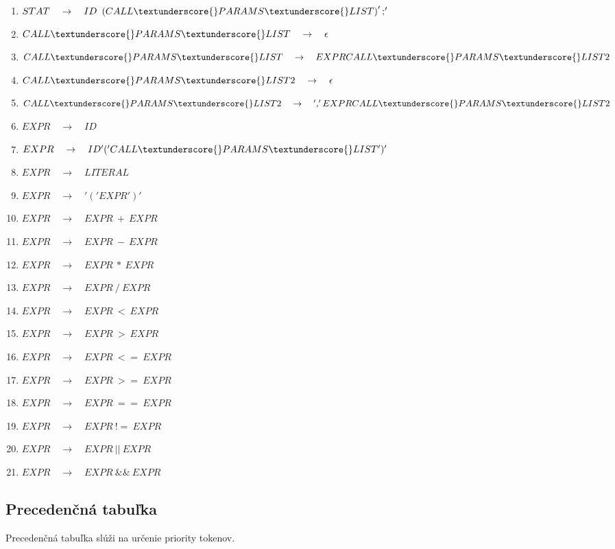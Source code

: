 \documentclass[12pt, a4paper]{article}
\begin{document}
\begin{enumerate}
				\item \( STAT\quad{}\rightarrow\quad{}ID\ \left( CALL\textunderscore{}PARAMS\textunderscore{}LIST \right) ';' \)
				\item \( CALL\textunderscore{}PARAMS\textunderscore{}LIST\quad{}\rightarrow\quad{}\epsilon \)
				\item \( CALL\textunderscore{}PARAMS\textunderscore{}LIST\quad{}\rightarrow\quad{}EXPR CALL\textunderscore{}PARAMS\textunderscore{}LIST2 \)
				\item \( CALL\textunderscore{}PARAMS\textunderscore{}LIST2\quad{}\rightarrow\quad{}\epsilon \)
				\item \( CALL\textunderscore{}PARAMS\textunderscore{}LIST2\quad{}\rightarrow\quad{}',' EXPR CALL\textunderscore{}PARAMS\textunderscore{}LIST2 \)
				\item \( EXPR\quad{}\rightarrow\quad{}ID \)
				\item \( EXPR\quad{}\rightarrow\quad{}ID '(' CALL\textunderscore{}PARAMS\textunderscore{}LIST ')' \)
				\item \( EXPR\quad{}\rightarrow\quad{}LITERAL \)
				\item \( EXPR\quad{}\rightarrow\quad{}'(' EXPR ')' \)
				\item \( EXPR\quad{}\rightarrow\quad{}EXPR\ +\ EXPR \)
				\item \( EXPR\quad{}\rightarrow\quad{}EXPR\ -\ EXPR \)
				\item \( EXPR\quad{}\rightarrow\quad{}EXPR\ *\ EXPR \)
				\item \( EXPR\quad{}\rightarrow\quad{}EXPR\ /\ EXPR \)
				\item \( EXPR\quad{}\rightarrow\quad{}EXPR\ <\ EXPR \)
				\item \( EXPR\quad{}\rightarrow\quad{}EXPR\ >\ EXPR \)
				\item \( EXPR\quad{}\rightarrow\quad{}EXPR\ <=\ EXPR \)
				\item \( EXPR\quad{}\rightarrow\quad{}EXPR\ >=\ EXPR \)
				\item \( EXPR\quad{}\rightarrow\quad{}EXPR\ ==\ EXPR \)
				\item \( EXPR\quad{}\rightarrow\quad{}EXPR\ !=\ EXPR \)
				\item \( EXPR\quad{}\rightarrow\quad{}EXPR\ ||\ EXPR \)
				\item \( EXPR\quad{}\rightarrow\quad{}EXPR\ \&\&\ EXPR \)
	        \end{enumerate}

        \subsection{Precedenčná tabuľka} \label{sec:tab}
        Precedenčná tabuľka slúži na určenie priority tokenov.
\end{document}
